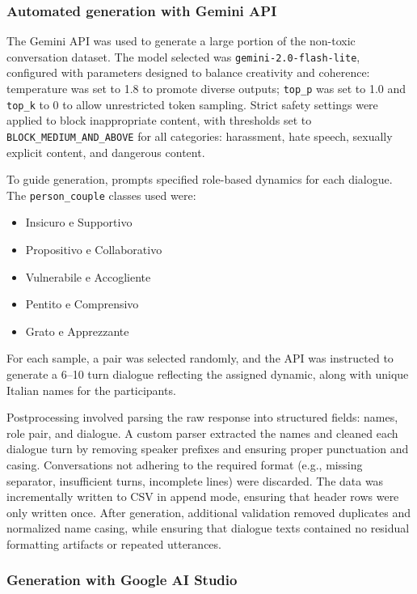 \documentclass[conference]{IEEEtran}
\begin{document}
\subsubsection{Automated generation with Gemini API}

The Gemini API was used to generate a large portion of the non-toxic conversation dataset. The model selected was \texttt{gemini-2.0-flash-lite}, configured with parameters designed to balance creativity and coherence: temperature was set to 1.8 to promote diverse outputs; \texttt{top\_p} was set to 1.0 and \texttt{top\_k} to 0 to allow unrestricted token sampling. Strict safety settings were applied to block inappropriate content, with thresholds set to \texttt{BLOCK\_MEDIUM\_AND\_ABOVE} for all categories: harassment, hate speech, sexually explicit content, and dangerous content.  

To guide generation, prompts specified role-based dynamics for each dialogue. The \texttt{person\_couple} classes used were:  
\begin{itemize}
    \item Insicuro e Supportivo
    \item Propositivo e Collaborativo
    \item Vulnerabile e Accogliente
    \item Pentito e Comprensivo
    \item Grato e Apprezzante
\end{itemize}
For each sample, a pair was selected randomly, and the API was instructed to generate a 6--10 turn dialogue reflecting the assigned dynamic, along with unique Italian names for the participants.  

Postprocessing involved parsing the raw response into structured fields: names, role pair, and dialogue. A custom parser extracted the names and cleaned each dialogue turn by removing speaker prefixes and ensuring proper punctuation and casing. Conversations not adhering to the required format (e.g., missing separator, insufficient turns, incomplete lines) were discarded. The data was incrementally written to CSV in append mode, ensuring that header rows were only written once. After generation, additional validation removed duplicates and normalized name casing, while ensuring that dialogue texts contained no residual formatting artifacts or repeated utterances.

\subsubsection{Generation with Google AI Studio}
\end{document}
